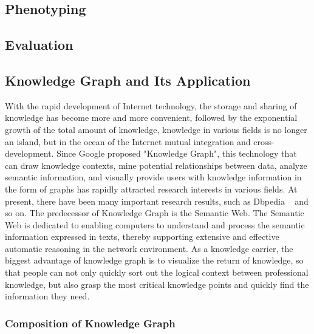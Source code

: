 
\subsection{Phenotyping}


\subsection{Evaluation}




\subsection{Knowledge Graph and Its Application}

With the rapid development of Internet technology, the storage and sharing of knowledge has become more and more convenient, followed by the exponential growth of the total amount of knowledge, knowledge in various fields is no longer an island, but in the ocean of the Internet mutual integration and cross-development. Since Google proposed "Knowledge Graph", this technology that can draw knowledge contexts, mine potential relationships between data, analyze semantic information, and visually provide users with knowledge information in the form of graphs has rapidly attracted research interests in various fields. At present, there have been many important research results, such as Dbpedia ~\cite{2007The} and so on. The predecessor of Knowledge Graph is the Semantic Web. The Semantic Web is dedicated to enabling computers to understand and process the semantic information expressed in texts, thereby supporting extensive and effective automatic reasoning in the network environment. As a knowledge carrier, the biggest advantage of knowledge graph is to visualize the return of knowledge, so that people can not only quickly sort out the logical context between professional knowledge, but also grasp the most critical knowledge points and quickly find the information they need.

\subsubsection{Composition of Knowledge Graph}

